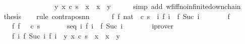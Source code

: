 \begin{isabellebody}
\ \ \ \ \ \ \ \ \ \ \ \ \ \ \ \ \ {\isasymin}\ {\isacharbraceleft}{\isacharparenleft}y{\isacharcomma}\ x{\isacharparenright}{\isachardot}\ {\isasymGamma}{\isasymturnstile}{\isacharparenleft}c{\isacharcomma}\ s{\isacharparenright}\ {\isasymrightarrow}\isactrlsup {\isacharasterisk}\ x\ {\isasymand}\ {\isasymGamma}{\isasymturnstile}x\ {\isasymrightarrow}\ y{\isacharbraceright}\isactrlsup {\isacharplus}{\isacharparenright}{\isachardoublequoteclose}\isanewline
\ \ \ \ \isamarkupfalse%
\ {\isacharparenleft}simp\ add{\isacharcolon}\ wf{\isacharunderscore}iff{\isacharunderscore}no{\isacharunderscore}infinite{\isacharunderscore}down{\isacharunderscore}chain{\isacharparenright}\isanewline
\ \ \isamarkupfalse%
\ {\isacharquery}thesis\isanewline
\ \ \isamarkupfalse%
\ {\isacharparenleft}rule\ contrapos{\isacharunderscore}nn{\isacharparenright}\isanewline
\ \ \ \ \isamarkupfalse%
\ {\isachardoublequoteopen}{\isasymexists}f{\isachardot}\ f\ {\isacharparenleft}{}{\isacharcolon}{\isacharcolon}nat{\isacharparenright}\ {\isacharequal}\ {\isacharparenleft}c{\isacharcomma}\ s{\isacharparenright}\ {\isasymand}\ {\isacharparenleft}{\isasymforall}i{\isachardot}\ {\isasymGamma}{\isasymturnstile}f\ i\ {\isasymrightarrow}\isactrlsup {\isacharplus}\ f\ {\isacharparenleft}Suc\ i{\isacharparenright}{\isacharparenright}{\isachardoublequoteclose}\isanewline
\ \ \ \ \isamarkupfalse%
\ \isamarkupfalse%
\ f\ \isanewline
\ \ \ \ \ \ f{}{\isacharcolon}\ {\isachardoublequoteopen}f\ {}\ {\isacharequal}\ {\isacharparenleft}c{\isacharcomma}\ s{\isacharparenright}{\isachardoublequoteclose}\ \isanewline
\ \ \ \ \ \ seq{\isacharcolon}\ {\isachardoublequoteopen}{\isasymforall}i{\isachardot}\ {\isasymGamma}{\isasymturnstile}f\ i\ {\isasymrightarrow}\isactrlsup {\isacharplus}\ f\ {\isacharparenleft}Suc\ i{\isacharparenright}{\isachardoublequoteclose}\isanewline
\ \ \ \ \ \ \isamarkupfalse%
\ iprover\isanewline
\ \ \ \ \isamarkupfalse%
\ \isanewline
\ \ \ \ \ \ {\isachardoublequoteopen}{\isasymexists}f{\isachardot}\ {\isasymforall}i{\isachardot}\ {\isacharparenleft}f\ {\isacharparenleft}Suc\ i{\isacharparenright}{\isacharcomma}\ f\ i{\isacharparenright}\ {\isasymin}\ {\isacharbraceleft}{\isacharparenleft}y{\isacharcomma}\ x{\isacharparenright}{\isachardot}\ {\isasymGamma}{\isasymturnstile}{\isacharparenleft}c{\isacharcomma}\ s{\isacharparenright}\ {\isasymrightarrow}\isactrlsup {\isacharasterisk}\ x\ {\isasymand}\ {\isasymGamma}{\isasymturnstile}x\ {\isasymrightarrow}\ y{\isacharbraceright}\isactrlsup {\isacharplus}{\isachardoublequoteclose}\isanewline

\end{isabellebody}
